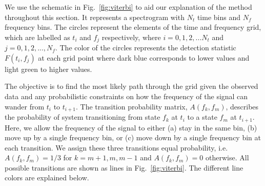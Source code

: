 \documentclass[paper-main.tex]{subfiles}
\begin{document}
We use the schematic in Fig.~\ref{fig:viterbi} to aid our explanation of the method throughout this section. 
It represents a spectrogram with $N_t$ time bins and $N_f$ frequency bins.
The circles represent the elements of the time and frequency grid, which are labelled as  
$t_i$ and $f_j$ respectively, where $i=0,1,2,...N_t$ and $j=0,1,2,...,N_f$. 
The color of the circles represents the detection statistic $F(t_i,f_j)$ at each grid point where dark blue corresponds to lower values and light green to higher values. 


The objective is to find the most likely path through the grid given the observed data and any probabilistic constraints on how the frequency of the signal can wander from $t_i$ to $t_{i+1}$. 
The transition probability matrix, $A(f_k,f_m)$, describes the probability of system transitioning from state $f_k$ at $t_i$ to a state $f_{m}$ at $t_{i+1}$. 
Here, we allow the frequency of the signal to either (a) stay in the same bin, (b) move up by a single frequency bin, or (c) move down by a single frequency bin at each transition. 
We assign these three transitions equal probability, i.e.\ $A(f_k,f_m)=1/3$ for $k=m+1,m,m-1$ and $A(f_k,f_m)=0$ otherwise.
All possible transitions are shown as lines in Fig.~\ref{fig:viterbi}.
The different line colors are explained below. 
\end{document}
